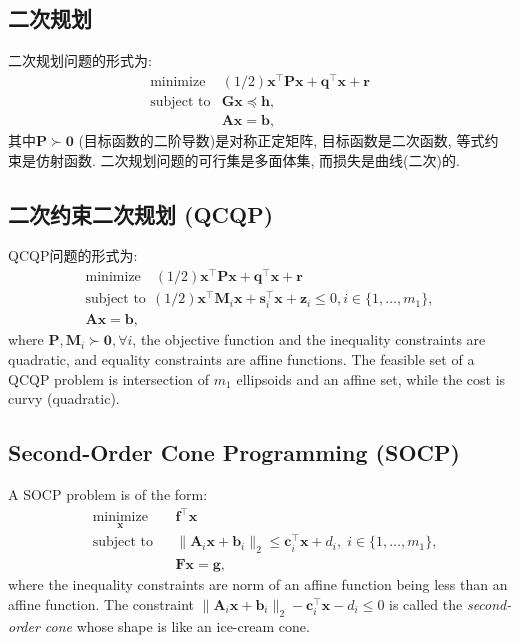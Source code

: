 \documentclass[lang=cn,10pt]{gorgeousnbook}
\numberwithin{equation}{section}%
\numberwithin{figure}{section}%
\begin{document}
\subsection{二次规划}
二次规划问题的形式为: 
\begin{equation}
\begin{array}{ll}\text{minimize}&(1/2)\boldsymbol{x}^\top \boldsymbol{Px}+\boldsymbol{q}^\top \boldsymbol{x}+\boldsymbol{r}\\\text{subject to}&\boldsymbol{Gx}\preceq \boldsymbol{h},\\&\boldsymbol{Ax}=\boldsymbol{b},\end{array}
\end{equation}
其中$\boldsymbol{P}\succ \mathbf{0}$ (目标函数的二阶导数)是对称正定矩阵, 目标函数是二次函数, 等式约束是仿射函数. 二次规划问题的可行集是多面体集, 而损失是曲线(二次)的.

\subsection{二次约束二次规划 (QCQP)}
QCQP问题的形式为:
\begin{equation}
\begin{gathered}
  \mathrm{minimize}\quad(1/2)\boldsymbol{x}^{\top}\boldsymbol{Px}+\boldsymbol{q}^{\top}\boldsymbol{x}+\boldsymbol{r} \\
  \text{subject to}~~(1/2)\boldsymbol{x}^{\top}\boldsymbol{M}_{i}\boldsymbol{x}+\boldsymbol{s}_{i}^{\top}\boldsymbol{x}+\boldsymbol{z}_{i}\leq0,i\in\{1,\ldots,m_{1}\}, \\
  \boldsymbol{Ax}=\boldsymbol{b}, 
\end{gathered}
\end{equation}
where $\boldsymbol{P}, \boldsymbol{M}_i \succ \boldsymbol{0}, \forall i$, the objective function and the inequality constraints are quadratic, and equality constraints are affine functions. 
The feasible set of a QCQP problem is intersection of $m_1$ ellipsoids and an affine set, while the cost is curvy (quadratic).

\subsection{Second-Order Cone Programming (SOCP)}

A SOCP problem is of the form:
\begin{equation}
\begin{aligned}
& \underset{\boldsymbol{x}}{\text{minimize}}
& & \boldsymbol{f}^\top \boldsymbol{x} \\
& \text{subject to}
& & \|\boldsymbol{A}_i \boldsymbol{x} + \boldsymbol{b}_i\|_2 \leq \boldsymbol{c}_i^\top \boldsymbol{x} + d_i, \; i \in \{1, \ldots, m_1\}, \\
& & & \boldsymbol{Fx} = \boldsymbol{g},
\end{aligned}
\end{equation}
where the inequality constraints are norm of an affine function being less than an affine function. The constraint $\|\boldsymbol{A}_i \boldsymbol{x} + \boldsymbol{b}_i\|_2 - \boldsymbol{c}_i^\top \boldsymbol{x} - d_i \leq 0$ is called the \textit{second-order cone} whose shape is like an ice-cream cone. 
\end{document}
